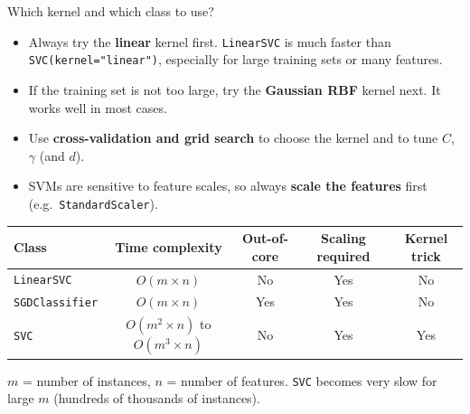 \documentclass[aspectratio=169,10pt]{beamer}
\begin{document}
\begin{frame}{Which kernel and which class to use?}
\small
\begin{itemize}
  \item Always try the \textbf{linear} kernel first. \texttt{LinearSVC} is much faster than \texttt{SVC(kernel="linear")}, especially for large training sets or many features.
  \item If the training set is not too large, try the \textbf{Gaussian RBF} kernel next. It works well in most cases.
  \item Use \textbf{cross-validation and grid search} to choose the kernel and to tune $C$, $\gamma$ (and $d$).
  \item SVMs are sensitive to feature scales, so always \textbf{scale the features} first (e.g.\ \texttt{StandardScaler}).
\end{itemize}
\begin{center}
\begin{tabular}{@{}lcccc@{}}
\toprule
Class & Time complexity & Out-of-core & Scaling required & Kernel trick \\
\midrule
\texttt{LinearSVC} & $O(m\times n)$ & No & Yes & No \\
\texttt{SGDClassifier} & $O(m\times n)$ & Yes & Yes & No \\
\texttt{SVC} & $O(m^2\times n)$ to $O(m^3\times n)$ & No & Yes & Yes \\
\bottomrule
\end{tabular}
\end{center}
\vspace{2pt}
\centering\scriptsize $m$ = number of instances, $n$ = number of features. \texttt{SVC} becomes very slow for large $m$ (hundreds of thousands of instances).
\end{frame}
\end{document}
